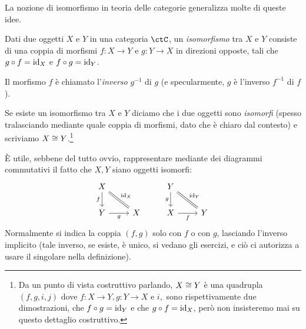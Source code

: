 La nozione di isomorfismo in teoria delle categorie generalizza molte di queste idee.
\begin{definition}[Isomorfismo]\label{def_isomorfismo}
	Dati due oggetti \(X\) e \(Y\) in una categoria \(\ctC\), un \emph{isomorfismo} tra \(X\) e \(Y\) consiste di una coppia di morfismi \(f:X\to Y\) e \(g:Y\to X\) in direzioni opposte, tali che \(g\circ f=\mathrm{id}_X\) e \(f\circ g=\mathrm{id}_Y\).

	Il morfismo \(f\) è chiamato l'\emph{inverso} \(g^{-1}\) di \(g\) (e specularmente, \(g\) è l'inverso \(f^{-1}\) di \(f\)).

	Se esiste un isomorfismo tra \(X\) e \(Y\) diciamo che i due oggetti sono \emph{isomorfi} (spesso tralasciando mediante quale coppia di morfismi, dato che è chiaro dal contesto) e scriviamo \(X\cong Y\).\footnote{Da un punto di vista costruttivo parlando, \(X\cong Y\) è una quadrupla \((f,g, i,j)\) dove \(f : X\to Y, g: Y\to X\) e \(i,\) sono rispettivamente due dimostrazioni, che \(f\circ g= \mathrm{id}_Y\) e che \(g\circ f=\mathrm{id}_X\), però non insisteremo mai su questo dettaglio costruttivo.}
\end{definition}
\`E utile, sebbene del tutto ovvio, rappresentare mediante dei diagrammi commutativi il fatto che \(X,Y\) siano oggetti isomorfi: %
\[
	\begin{tikzcd}
		X\ar[d, "f"'] \ar[dr, equal, "\id_X"]& & Y \ar[dr, equal, "\id_Y"]\ar[d,"g"']\\
		Y \ar[r, "g"']& X & X \ar[r, "f"']& Y
	\end{tikzcd}
\]
Normalmente si indica la coppia \((f,g)\) solo con \(f\) o con \(g\), lasciando l'inverso implicito (tale inverso, se esiste, è unico, si vedano gli esercizi, e ciò ci autorizza a usare il singolare nella definizione).
